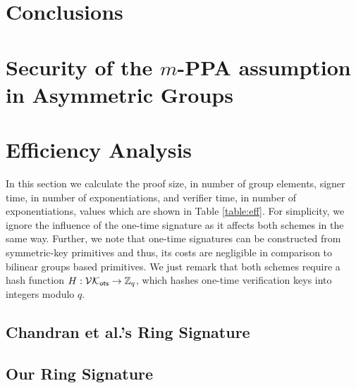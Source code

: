 \documentclass{llncs}
\begin{document}
	\section{Conclusions}

		





\appendix

	\section{Security of the $m$-PPA assumption in Asymmetric Groups} \label{sec:aPPA}
	
		


%

	\section{Efficiency Analysis} \label{sec:eff-analysis}
		In this section we calculate the proof size, in number of group elements, signer time, in number of exponentiations, and verifier time, in number of exponentiations, values which are shown in Table \ref{table:eff}. For simplicity, we ignore the influence of the one-time signature as it affects both schemes in the same way. Further, we note that one-time signatures can be constructed from symmetric-key primitives and thus, its costs are negligible in comparison to bilinear groups based primitives. We just remark that both schemes require a hash function $H:\mathcal{VK}_{\mathsf{ots}}\to\mathbb{Z}_q$, which hashes one-time verification keys into integers modulo $q$.
		\subsection{Chandran et al.'s Ring Signature}
			
		\subsection{Our Ring Signature}
			
\end{document}
